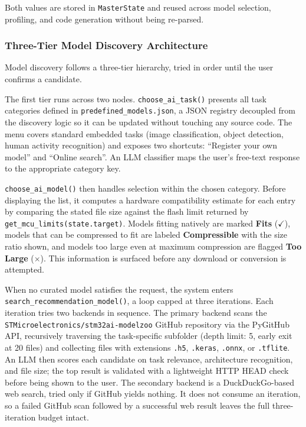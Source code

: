 Both values are stored in \texttt{MasterState} and reused across model selection, profiling, and code generation without being re-parsed.

\subsubsection{Three-Tier Model Discovery Architecture}

Model discovery follows a three-tier hierarchy, tried in order until the user confirms a candidate.

\begin{description}[leftmargin=0pt, itemsep=10pt]

    \item[\textbf{Tier 1 - Curated Task-Based Models.}]
    The first tier runs across two nodes. \texttt{choose\_\allowbreak ai\_\allowbreak task()} presents all task categories defined in \texttt{predefined\_models.json}, a JSON registry decoupled from the discovery logic so it can be updated without touching any source code. The menu covers standard embedded tasks (image classification, object detection, human activity recognition) and exposes two shortcuts: ``Register your own model'' and ``Online search''. An LLM classifier maps the user's free-text response to the appropriate category key.

    \texttt{choose\_\allowbreak ai\_\allowbreak model()} then handles selection within the chosen category. Before displaying the list, it computes a hardware compatibility estimate for each entry by comparing the stated file size against the flash limit returned by \texttt{get\_\allowbreak mcu\_\allowbreak limits(state.target)}. Models fitting natively are marked \textbf{Fits} ($\checkmark$), models that can be compressed to fit are labeled \textbf{Compressible} with the size ratio shown, and models too large even at maximum compression are flagged \textbf{Too Large} ($\times$). This information is surfaced before any download or conversion is attempted.

    \item[\textbf{Tier 2 - Iterative Web Search with Hybrid Retrieval.}]
    When no curated model satisfies the request, the system enters \texttt{search\_\allowbreak recommendation\_\allowbreak model()}, a loop capped at three iterations. Each iteration tries two backends in sequence. The primary backend scans the \texttt{STMicroelectronics/stm32ai-modelzoo} GitHub repository via the PyGitHub API, recursively traversing the task-specific subfolder (depth limit: 5, early exit at 20 files) and collecting files with extensions \texttt{.h5}, \texttt{.keras}, \texttt{.onnx}, or \texttt{.tflite}. An LLM then scores each candidate on task relevance, architecture recognition, and file size; the top result is validated with a lightweight HTTP HEAD check before being shown to the user. The secondary backend is a DuckDuckGo-based web search, tried only if GitHub yields nothing. It does not consume an iteration, so a failed GitHub scan followed by a successful web result leaves the full three-iteration budget intact.


\end{description}
